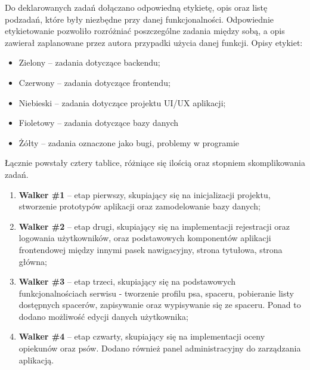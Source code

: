 Do deklarowanych zadań dołączano odpowiedną etykietę, opis oraz listę podzadań, które były niezbędne przy danej funkcjonalności. Odpowiednie etykietowanie pozwoliło rozróżniać poszczególne zadania między sobą, a opis zawierał zaplanowane przez autora przypadki użycia danej funkcji.
Opisy etykiet:
\begin{itemize}[leftmargin=1cm]
    \item Zielony -- zadania dotyczące backendu;
    \item Czerwony -- zadania dotyczące frontendu;
    \item Niebieski -- zadania dotyczące projektu UI/UX aplikacji;
    \item Fioletowy -- zadania dotyczące bazy danych
    \item Żółty -- zadania oznaczone jako bugi, problemy w programie
\end{itemize}

Łącznie powstały cztery tablice, różniące się ilością oraz stopniem skomplikowania zadań.
\begin{enumerate}[leftmargin=1cm]
  \item \textbf{Walker \#1} -- etap pierwszy, skupiający się na inicjalizacji projektu, stworzenie prototypów aplikacji oraz zamodelowanie bazy danych;
  \item \textbf{Walker \#2} -- etap drugi, skupiający się na implementacji rejestracji oraz logowania użytkowników, oraz podstawowych komponentów aplikacji frontendowej między innymi pasek nawigacyjny, strona tytułowa, strona główna;
  \item \textbf{Walker \#3} -- etap trzeci, skupiający się na podstawowych funkcjonalnościach serwisu - tworzenie profilu psa, spaceru, pobieranie listy dostępnych spacerów, zapisywanie oraz wypisywanie się ze spaceru. Ponad to dodano możliwość edycji danych użytkownika;
  \item \textbf{Walker \#4} -- etap czwarty, skupiający się na implementacji oceny opiekunów oraz psów. Dodano również panel administracyjny do zarządzania aplikacją.
\end{enumerate}

